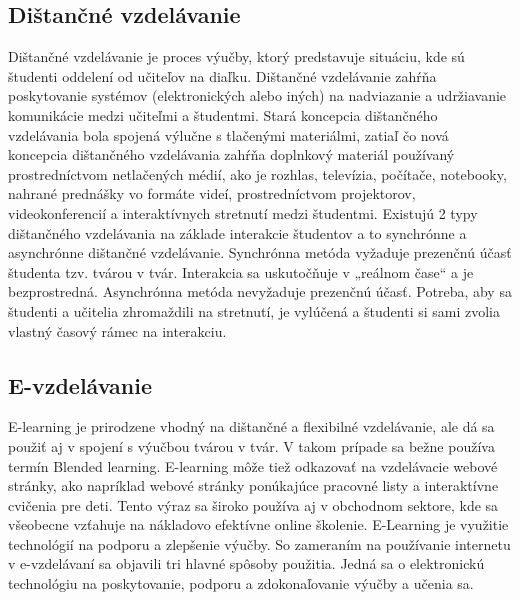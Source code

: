\documentclass[10pt,oneside,slovak,a4paper]{article}
\begin{document}
\subsection{Dištančné vzdelávanie}
Dištančné vzdelávanie je proces výučby, ktorý predstavuje situáciu, kde sú študenti oddelení od učiteľov na diaľku\cite{India}. Dištančné vzdelávanie zahŕňa poskytovanie systémov (elektronických alebo iných) na nadviazanie a udržiavanie komunikácie medzi učiteľmi a študentmi.
Stará koncepcia dištančného vzdelávania bola spojená výlučne s tlačenými materiálmi, zatiaľ čo nová koncepcia dištančného vzdelávania zahŕňa doplnkový materiál používaný prostredníctvom netlačených médií, ako je rozhlas, televízia, počítače, notebooky, nahrané prednášky vo formáte videí, prostredníctvom projektorov, videokonferencií a interaktívnych stretnutí medzi študentmi.
Existujú 2 typy dištančného vzdelávania na základe interakcie študentov a to synchrónne a asynchrónne dištančné vzdelávanie. Synchrónna metóda vyžaduje prezenčnú účasť študenta tzv. tvárou v tvár. Interakcia sa uskutočňuje v „reálnom čase“ a je bezprostredná. Asynchrónna metóda nevyžaduje prezenčnú účasť. Potreba, aby sa študenti a učitelia zhromaždili na stretnutí, je vylúčená a študenti si sami zvolia vlastný časový rámec na interakciu.
\subsection{E-vzdelávanie}
E-learning je prirodzene vhodný na dištančné a flexibilné vzdelávanie, ale dá sa použiť aj v spojení s výučbou tvárou v tvár. V takom prípade sa bežne používa termín Blended learning. E-learning môže tiež odkazovať na vzdelávacie webové stránky, ako napríklad webové stránky ponúkajúce pracovné listy a interaktívne cvičenia pre deti. Tento výraz sa široko používa aj v obchodnom sektore, kde sa všeobecne vzťahuje na nákladovo efektívne online školenie. E-Learning je využitie technológií na podporu a zlepšenie výučby. So zameraním na používanie internetu v e-vzdelávaní sa objavili tri hlavné spôsoby použitia. Jedná sa o elektronickú technológiu na poskytovanie, podporu a zdokonaľovanie výučby a učenia sa.\cite{elearningDef}
\end{document}
